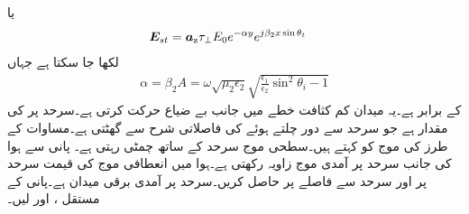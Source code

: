 یا
\begin{align}\label{مساوات_ترچھی_سطحی_موج}
{\ensuremath{{\boldsymbol{E}}}}_{st} &={\boldsymbol{a}}_{\textup{z}} \tau_{\perp} E_0 e^{-\alpha y}e^{j \beta_2 x \sin \theta_t}
\end{align}
لکھا جا سکتا ہے جہاں
\begin{align}
\alpha=\beta_2 A =\omega \sqrt{\mu_2 \epsilon_2} \sqrt{\frac{\epsilon_1}{\epsilon_2}\sin^2 \theta_i -1}
\end{align}
کے برابر ہے۔یہ میدان کم کثافت خطے میں  جانب بے ضیاع حرکت کرتی ہے۔سرحد پر  کی مقدار  ہے جو سرحد سے دور چلتے ہوئے  کی  فاصلاتی شرح سے گھٹتی ہے۔مساوات  کے طرز کی موج کو  کہتے ہیں۔سطحی موج سرحد کے ساتھ چمٹی رہتی ہے۔ 
پانی سے ہوا کی جانب سرحد پر آمدی موج  زاویہ رکھتی ہے۔ہوا میں انعطافی موج کی قیمت سرحد پر اور سرحد سے  فاصلے پر حاصل کریں۔سرحد پر آمدی برقی میدان  ہے۔پانی کے مستقل ،  اور  لیں۔ 


